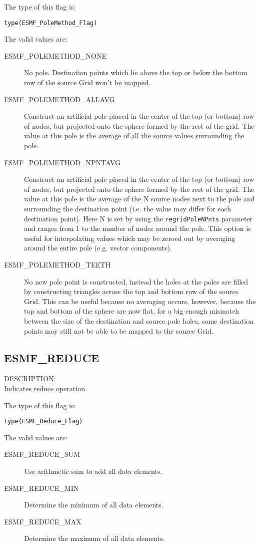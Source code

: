 The type of this flag is:

{\tt type(ESMF\_PoleMethod\_Flag)}

The valid values are:
\begin{description}
\item [ESMF\_POLEMETHOD\_NONE]
      No pole. Destination points which lie above the top or below the bottom row of the source Grid won't be mapped. 
\item [ESMF\_POLEMETHOD\_ALLAVG]
      Construct an artificial pole placed in the center of the top (or bottom) row of nodes, but projected onto the sphere formed by the rest of the grid. The value at this pole is the average of all the source values surrounding the pole.
\item [ESMF\_POLEMETHOD\_NPNTAVG] Construct an artificial pole placed in the center of the top (or bottom) row of nodes, but projected onto the sphere formed by the rest of the grid. The value at this pole is the average of the N source nodes next to the pole and surrounding the destination point (i.e. the value may differ for each destination point). Here N is set by using the {\tt regridPoleNPnts} parameter and ranges from 1 to the number of nodes around the pole. This option is useful for interpolating values which may be zeroed out by averaging around the entire pole (e.g. vector components). 
\item [ESMF\_POLEMETHOD\_TEETH]
    No new pole point is constructed, instead the holes at the poles are filled by constructing triangles across the top and bottom row of the source Grid. This can be useful because no averaging occurs, however, because the top and bottom of the sphere are now flat, for a big enough mismatch between the size of the destination and source pole holes, some destination points may still not be able to be mapped to the source Grid. 
\end{description}

\subsection{ESMF\_REDUCE}
\label{const:reduce}
{\sf DESCRIPTION:\\}
Indicates reduce operation.

The type of this flag is:

{\tt type(ESMF\_Reduce\_Flag)}

The valid values are:
\begin{description}
   \item [ESMF\_REDUCE\_SUM]
         Use arithmetic sum to add all data elements.
   \item [ESMF\_REDUCE\_MIN]
         Determine the minimum of all data elements.
   \item [ESMF\_REDUCE\_MAX]
         Determine the maximum of all data elements.
\end{description}

